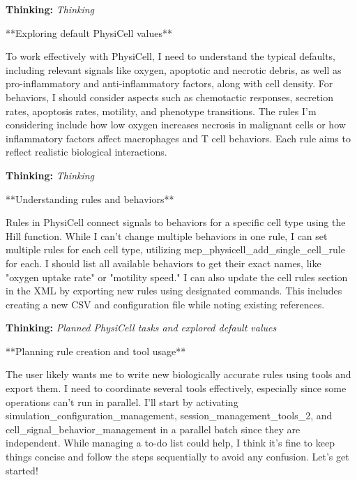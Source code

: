 \documentclass[11pt,a4paper]{article}
\begin{document}
\begin{thinkbox}
\textbf{Thinking:} \textit{Thinking}

**Exploring default PhysiCell values**

To work effectively with PhysiCell, I need to understand the typical defaults, including relevant signals like oxygen, apoptotic and necrotic debris, as well as pro-inflammatory and anti-inflammatory factors, along with cell density. For behaviors, I should consider aspects such as chemotactic responses, secretion rates, apoptosis rates, motility, and phenotype transitions. The rules I’m considering include how low oxygen increases necrosis in malignant cells or how inflammatory factors affect macrophages and T cell behaviors. Each rule aims to reflect realistic biological interactions.

\end{thinkbox}
\begin{thinkbox}
\textbf{Thinking:} \textit{Thinking}

**Understanding rules and behaviors**

Rules in PhysiCell connect signals to behaviors for a specific cell type using the Hill function. While I can’t change multiple behaviors in one rule, I can set multiple rules for each cell type, utilizing mcp\_physicell\_add\_single\_cell\_rule for each. I should list all available behaviors to get their exact names, like "oxygen uptake rate" or "motility speed." I can also update the cell rules section in the XML by exporting new rules using designated commands. This includes creating a new CSV and configuration file while noting existing references.

\end{thinkbox}
\begin{thinkbox}
\textbf{Thinking:} \textit{Planned PhysiCell tasks and explored default values}

**Planning rule creation and tool usage**

The user likely wants me to write new biologically accurate rules using tools and export them. I need to coordinate several tools effectively, especially since some operations can’t run in parallel. I'll start by activating simulation\_configuration\_management, session\_management\_tools\_2, and cell\_signal\_behavior\_management in a parallel batch since they are independent. While managing a to-do list could help, I think it’s fine to keep things concise and follow the steps sequentially to avoid any confusion. Let’s get started!

\end{thinkbox}
\end{document}
